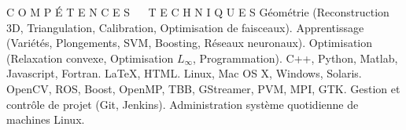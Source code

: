 




\begin{rubric}{C O M P \'{E} T E N C E S ~~ T E C H N I Q U E S}
  G\'{e}om\'{e}trie (Reconstruction 3D, Triangulation, Calibration, Optimisation de faisceaux).
  Apprentissage (Vari\'{e}t\'{e}s, Plongements, SVM, Boosting, R\'{e}seaux neuronaux).
  Optimisation (Relaxation convexe, Optimisation $L_{\infty}$, Programmation).
\entry*[Langages:]
  C++, Python, Matlab, Javascript, Fortran.
\entry*[Langages:]
  \LaTeX, HTML.
  Linux, Mac OS X, Windows, Solaris.
\entry*[Librairies:] OpenCV, ROS, Boost, OpenMP, TBB, GStreamer, PVM, MPI, GTK.
\entry*[Autres:]
  Gestion et contr\^{o}le de projet (Git, Jenkins).
\entry*[Autres:]
  Administration syst\`{e}me quotidienne de machines Linux.
\end{rubric}


